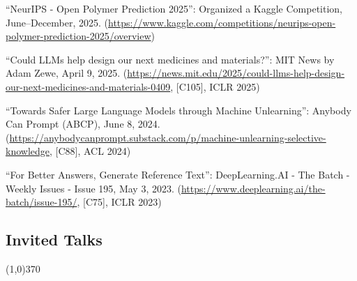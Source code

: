 \documentclass[10pt]{article}
\newenvironment{myindentpar}[1]%
{\begin{list}{}%
         {\setlength{\leftmargin}{#1}}%
         \item[]%
}
{\end{list}}
\newcounter{list}
\begin{document}
\begin{myindentpar}{0.75cm}

\hspace{-0.75cm} ``NeurIPS - Open Polymer Prediction 2025'': Organized a Kaggle Competition, June--December, 2025. (\url{https://www.kaggle.com/competitions/neurips-open-polymer-prediction-2025/overview})

\hspace{-0.75cm} ``Could LLMs help design our next medicines and materials?'': MIT News by Adam Zewe, April 9, 2025. (\url{https://news.mit.edu/2025/could-llms-help-design-our-next-medicines-and-materials-0409}, [C105], ICLR 2025)

\hspace{-0.75cm} ``Towards Safer Large Language Models through Machine Unlearning'': Anybody Can Prompt (ABCP), June 8, 2024. (\url{https://anybodycanprompt.substack.com/p/machine-unlearning-selective-knowledge}, [C88], ACL 2024)

\hspace{-0.75cm} ``For Better Answers, Generate Reference Text'': DeepLearning.AI - The Batch - Weekly Issues - Issue 195, May 3, 2023. (\url{https://www.deeplearning.ai/the-batch/issue-195/}, [C75], ICLR 2023)

\end{myindentpar}

\subsection{\sc Invited Talks}
\vspace{-0.4cm} \line(1,0){370} \vspace{-0.1cm}
\end{document}
